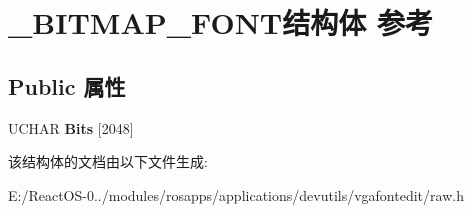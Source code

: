 \hypertarget{struct___b_i_t_m_a_p___f_o_n_t}{}\section{\+\_\+\+B\+I\+T\+M\+A\+P\+\_\+\+F\+O\+N\+T结构体 参考}
\label{struct___b_i_t_m_a_p___f_o_n_t}
\subsection*{Public 属性}
\begin{DoxyCompactItemize}
\item 
\mbox{\label{struct___b_i_t_m_a_p___f_o_n_t_a6a96547f86f401522a28d91c857f766a}} 
U\+C\+H\+AR {\bfseries Bits} \mbox{[}2048\mbox{]}
\end{DoxyCompactItemize}


该结构体的文档由以下文件生成\+:\begin{DoxyCompactItemize}
\item 
E\+:/\+React\+O\+S-\/0../modules/rosapps/applications/devutils/vgafontedit/raw.\+h\end{DoxyCompactItemize}
